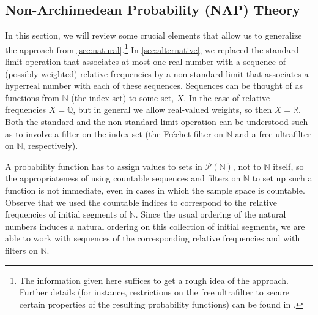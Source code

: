 \subsection{Non-Archimedean Probability (NAP) Theory}\label{sec:NAP}
In this section, we will review some crucial elements that allow us to generalize the approach from \autoref{sec:natural}.\footnote{The information given here suffices to get a rough idea of the approach. Further details (for instance, restrictions on the free ultrafilter to secure certain properties of the resulting probability functions) can be found in \citet{Benci_etal:2013}.}
In \autoref{sec:alternative}, we replaced the standard limit operation that associates at most one real number with a sequence of (possibly weighted) relative frequencies by a non-standard limit that associates a hyperreal number with each of these sequences.
Sequences can be thought of as functions from $\mathbb{N}$ (the index set) to some set, $X$. In the case of relative frequencies $X=\mathbb{Q}$, but in general we allow real-valued weights, so then $X=\mathbb{R}$.
Both the standard and the non-standard limit operation can be understood such as to involve a filter on the index set (the Fr\'{e}chet filter on $\mathbb{N}$ and a free ultrafilter on $\mathbb{N}$, respectively).

A probability function has to assign values to sets in $\mathcal{P}(\mathbb{N})$, not to $\mathbb{N}$ itself, so the appropriateness of using countable sequences and filters on $\mathbb{N}$ to set up such a function is not immediate, even in cases in which the sample space is countable. Observe that we used the countable indices to correspond to the relative frequencies of initial segments of $\mathbb{N}$. Since the usual ordering of the natural numbers induces a natural ordering on this collection of initial segments, we are able to work with sequences of the corresponding relative frequencies and with filters on $\mathbb{N}$.

